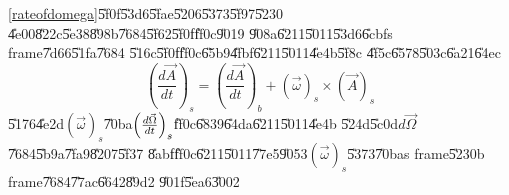 \documentclass[12pt,a4paper]{article}
\begin{document}
\ref{rateofdomega}\U{5f0f}\U{53d6}\U{5fae}\U{5206}\U{5373}\U{5f97}\U{5230}%
\U{4e00}\U{822c}\U{5e38}\U{898b}\U{7684}\U{5f62}\U{5f0f}\U{ff0c}\U{9019}%
\U{908a}\U{6211}\U{5011}\U{53d6}\U{6cbf}s frame\U{7d66}\U{51fa}\U{7684}%
\U{516c}\U{5f0f}\U{ff0c}\U{65b9}\U{4fbf}\U{6211}\U{5011}\U{4e4b}\U{5f8c}%
\U{4f5c}\U{6578}\U{503c}\U{6a21}\U{64ec}%
\begin{equation}
\left( \frac{d\vec{A}}{dt}\right) _{s}=\left( \frac{d\vec{A}}{dt}\right)
_{b}+\left( \vec{\omega}\right) _{s}\times \left( \vec{A}\right) _{s}
\label{rateofchange}
\end{equation}%
\U{5176}\U{4e2d}$\left( \vec{\omega}\right) _{s}$\U{70ba}$\left( \frac{d\vec{%
\Omega}}{dt}\right) _{s}$\U{ff0c}\U{6839}\U{64da}\U{6211}\U{5011}\U{4e4b}%
\U{524d}\U{5c0d}$d\vec{\Omega}$\U{7684}\U{5b9a}\U{7fa9}\U{8207}\U{5f37}%
\U{8abf}\U{ff0c}\U{6211}\U{5011}\U{77e5}\U{9053}$\left( \vec{\omega}\right)
_{s}$\U{5373}\U{70ba}s frame\U{5230}b frame\U{7684}\U{77ac}\U{6642}\U{89d2}%
\U{901f}\U{5ea6}\U{3002}
\end{document}
